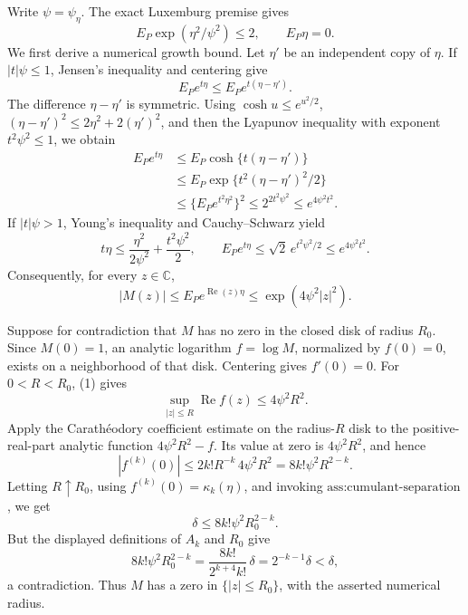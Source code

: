 Write \(\psi=\psi_{\eta}\).  The exact Luxemburg premise gives
\[
 E_P\exp(\eta^2/\psi^2)\le2,
 \qquad E_P\eta=0.
\]
We first derive a numerical growth bound.  Let \(\eta'\) be an independent copy of \(\eta\).  If \(|t|\psi\le1\), Jensen's inequality and centering give
\[
 E_Pe^{t\eta}\le E_Pe^{t(\eta-\eta')}.
\]
The difference \(\eta-\eta'\) is symmetric.  Using \(\cosh u\le e^{u^2/2}\), \((\eta-\eta')^2\le2\eta^2+2(\eta')^2\), and then the Lyapunov inequality with exponent \(t^2\psi^2\le1\), we obtain
\[
\begin{aligned}
 E_Pe^{t\eta}
 &\le E_P\cosh\{t(\eta-\eta')\}\\
 &\le E_P\exp\{t^2(\eta-\eta')^2/2\}\\
 &\le \{E_Pe^{t^2\eta^2}\}^2
 \le 2^{2t^2\psi^2}
 \le e^{4\psi^2t^2}.
\end{aligned}
\]
If \(|t|\psi>1\), Young's inequality and Cauchy--Schwarz yield
\[
 t\eta\le\frac{\eta^2}{2\psi^2}+\frac{t^2\psi^2}{2},
 \qquad
 E_Pe^{t\eta}\le\sqrt2\,e^{t^2\psi^2/2}
 \le e^{4\psi^2t^2}.
\]
Consequently, for every \(z\in\mathbb C\),
\[
 |M(z)|\le E_Pe^{\operatorname{Re}(z)\eta}
 \le \exp(4\psi^2|z|^2). \tag{1}
\]

Suppose for contradiction that \(M\) has no zero in the closed disk of radius \(R_0\).  Since \(M(0)=1\), an analytic logarithm \(f=\log M\), normalized by \(f(0)=0\), exists on a neighborhood of that disk.  Centering gives \(f'(0)=0\).  For \(0<R<R_0\), (1) gives
\[
 \sup_{|z|\le R}\operatorname{Re}f(z)\le4\psi^2R^2.
\]
Apply the Carath\'eodory coefficient estimate on the radius-\(R\) disk to the positive-real-part analytic function \(4\psi^2R^2-f\).  Its value at zero is \(4\psi^2R^2\), and hence
\[
 |f^{(k)}(0)|
 \le 2k!R^{-k}\,4\psi^2R^2
 =8k!\psi^2R^{2-k}. \tag{2}
\]
Letting \(R\uparrow R_0\), using \(f^{(k)}(0)=\kappa_k(\eta)\), and invoking \(\text{ass:cumulant-separation}\), we get
\[
 \delta\le8k!\psi^2R_0^{2-k}.
\]
But the displayed definitions of \(A_k\) and \(R_0\) give
\[
 8k!\psi^2R_0^{2-k}
 =\frac{8k!}{2^{k+4}k!}\,\delta
 =2^{-k-1}\delta<\delta,
\]
a contradiction.  Thus \(M\) has a zero in \(\{|z|\le R_0\}\), with the asserted numerical radius.